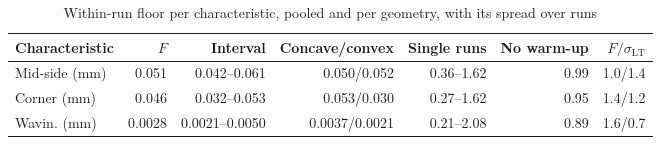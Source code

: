 \documentclass[pdflatex,sn-basic,lineno]{sn-jnl}
\newcommand{\tabsize}{\fontsize{8}{9.5}\selectfont}
\providecommand{\DIFaddbeginFL}{} %
\providecommand{\DIFaddendFL}{} %
\providecommand{\DIFdelbeginFL}{} %
\providecommand{\DIFdelendFL}{} %
\newcommand{\DIFscaledelfig}{0.5}
\newlength{\DIFdelgraphicswidth} %
\newlength{\DIFdelgraphicsheight} %
\newcommand{\DIFaddincludegraphics}[2][]{{\color{blue}\fbox{\DIFOincludegraphics[#1]{#2}}}} %
\newcommand{\DIFdelincludegraphics}[2][]{%
\sbox{\DIFdelgraphicsbox}{\DIFOincludegraphics[#1]{#2}}%
\settoboxwidth{\DIFdelgraphicswidth}{\DIFdelgraphicsbox} %
\settoboxtotalheight{\DIFdelgraphicsheight}{\DIFdelgraphicsbox} %
\scalebox{\DIFscaledelfig}{%
\parbox[b]{\DIFdelgraphicswidth}{\usebox{\DIFdelgraphicsbox}\\[-\baselineskip] \rule{\DIFdelgraphicswidth}{0em}}\llap{\resizebox{\DIFdelgraphicswidth}{\DIFdelgraphicsheight}{%
\setlength{\unitlength}{\DIFdelgraphicswidth}%
\begin{picture}(1,1)%
\thicklines\linethickness{2pt} %
{\color[rgb]{1,0,0}\put(0,0){\framebox(1,1){}}}%
{\color[rgb]{1,0,0}\put(0,0){\line( 1,1){1}}}%
{\color[rgb]{1,0,0}\put(0,1){\line(1,-1){1}}}%
\end{picture}%
}\hspace*{3pt}}} %
} %
\DeclareRobustCommand{\DIFaddbeginFL}{\DIFOaddbeginFL \let\includegraphics\DIFaddincludegraphics} %
\DeclareRobustCommand{\DIFaddendFL}{\DIFOaddendFL \let\includegraphics\DIFOincludegraphics} %
\DeclareRobustCommand{\DIFdelbeginFL}{\DIFOdelbeginFL \let\includegraphics\DIFdelincludegraphics} %
\DeclareRobustCommand{\DIFdelendFL}{\DIFOaddendFL \let\includegraphics\DIFOincludegraphics} %
\begin{document}
\begin{table}[t]
\tabsize
\DIFdelbeginFL %
\DIFdelendFL \DIFaddbeginFL \setlength{\tabcolsep}{3pt}
\caption{Within-run floor per characteristic, pooled and per geometry, with its spread over runs}\DIFaddendFL \label{tab:floors}
\DIFdelbeginFL %
\DIFdelendFL \DIFaddbeginFL \begin{tabular*}{\textwidth}{@{\extracolsep{\fill}}lrrrrrr@{}}
\toprule
Characteristic & $F$ & Interval & Concave/convex & Single runs & No warm-up & $F/\sigma_\mathrm{LT}$ \\
\midrule
Mid-side (mm) & 0.051 & 0.042--0.061 & 0.050/0.052 & 0.36--1.62 & 0.99 & 1.0/1.4 \\
Corner (mm) & 0.046 & 0.032--0.053 & 0.053/0.030 & 0.27--1.62 & 0.95 & 1.4/1.2 \\
Wavin. (mm) & 0.0028 & 0.0021--0.0050 & 0.0037/0.0021 & 0.21--2.08 & 0.89 & 1.6/0.7 \\

\end{tabular*}
\end{table}
\end{document}
